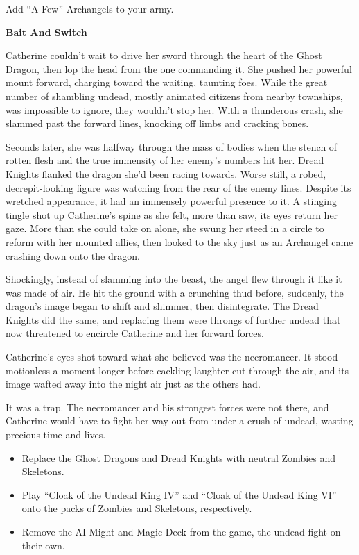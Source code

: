 \begin{multicols*}{2}
\textcolor{darkcandyapplered}{Add ``A Few'' Archangels to your army.}

\textbf{Bait And Switch}

Catherine couldn't wait to drive her sword through the heart of the Ghost Dragon, then lop the head from the one commanding it. She pushed her powerful mount forward, charging toward the waiting, taunting foes. While the great number of shambling undead, mostly animated citizens from nearby townships, was impossible to ignore, they wouldn't stop her. With a thunderous crash, she slammed past the forward lines, knocking off limbs and cracking bones.

Seconds later, she was halfway through the mass of bodies when the stench of rotten flesh and the true immensity of her enemy's numbers hit her. Dread Knights flanked the dragon she'd been racing towards. Worse still, a robed, decrepit-looking figure was watching from the rear of the enemy lines. Despite its wretched appearance, it had an immensely powerful presence to it. A stinging tingle shot up Catherine's spine as she felt, more than saw, its eyes return her gaze. More than she could take on alone, she swung her steed in a circle to reform with her mounted allies, then looked to the sky just as an Archangel came crashing down onto the dragon.

Shockingly, instead of slamming into the beast, the angel flew through it like it was made of air. He hit the ground with a crunching thud before, suddenly, the dragon's image began to shift and shimmer, then disintegrate. The Dread Knights did the same, and replacing them were throngs of further undead that now threatened to encircle Catherine and her forward forces.

Catherine's eyes shot toward what she believed was the necromancer. It stood motionless a moment longer before cackling laughter cut through the air, and its image wafted away into the night air just as the others had.

It was a trap. The necromancer and his strongest forces were not there, and Catherine would have to fight her way out from under a crush of undead, wasting precious time and lives.

\begin{itemize}
  \item \textcolor{darkcandyapplered}{Replace the Ghost Dragons and Dread Knights with  neutral Zombies and Skeletons.}
  \item \textcolor{darkcandyapplered}{Play ``Cloak of the Undead King IV'' and ``Cloak of the Undead King VI'' onto the packs of Zombies and Skeletons, respectively.}
  \item \textcolor{darkcandyapplered}{Remove the AI Might and Magic Deck from the game, the undead fight on their own.}
\end{itemize}



\end{multicols*}
